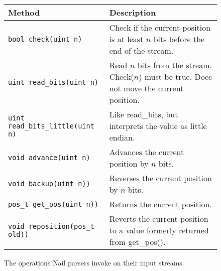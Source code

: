 \begin{figure*}
  \begin{tabular}{lp{2.75in}}
    \toprule
    \bf Method & \bf Description \\
    \midrule
    \texttt{bool check(uint n)} & Check if the current position is at least $n$ bits before the end of the stream. \\
    \texttt{uint read\_bits(uint n)} &  Read $n$ bits from the stream. Check($n$) must be true. Does not move the current position.\\
    \texttt{uint read\_bits\_little(uint n)} &  Like read\_bits, but interprets the value as little endian.\\
    \texttt{void advance(uint n)} & Advances the current position by $n$ bits.\\
    \texttt{void backup(uint n))} & Reverses the current position by $n$ bits.\\
    \texttt{pos\_t get\_pos(uint n))} & Returns the current position.\\
    \texttt{void reposition(pos\_t old))} & Reverts the current position to a value formerly returned from get\_pos().\\

    \bottomrule
    \end{tabular}
\label{fig:stream-api}
\caption{The operations Nail parsers invoke on their input streams.}
\end{figure*}
